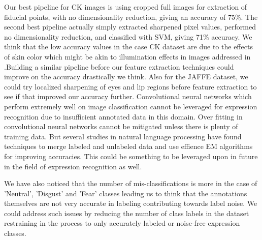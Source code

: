 \documentclass[10pt,twocolumn,letterpaper]{article}
\begin{document}
Our best pipeline for CK images is using cropped full images for extraction of fiducial points, with no dimensionality reduction, giving an accuracy of 75\%. The second best pipeline actually simply extracted sharpened pixel values, performed no dimensionality reduction, and classified with SVM, giving 71\% accuracy. We think that the low accuracy values in the case CK dataset are due to the effects of skin color which might be akin to illumination effects in images addressed in \cite{FERvariablelighting}.Building a similar pipeline before our feature extraction techniques could improve on the accuracy drastically we think. Also for the JAFFE dataset, we could try localized sharpening of eyes and lip regions before feature extraction to see if that improved our accuracy further. Convolutional neural networks which perform extremely well on image classification cannot be leveraged for expression recognition due to insufficient annotated data in this domain. Over fitting in convolutional neural networks cannot be mitigated unless there is plenty of training data. But several studies in natural language processing \cite{nigam2006} have found techniques to merge labeled and unlabeled data and use effience EM algorithms for improving accuracies. This could be something to be leveraged upon in future in the field of expression recognition as well.

We have also noticed that the number of mis-classifications is more in the case of 'Neutral', 'Disgust' and 'Fear' classes leading us to think that the annotations themselves are not very accurate in labeling contributing towards label noise. We could address such issues by reducing the number of class labels in the dataset restraining in the process to only accurately labeled or  noise-free expression classes.\\
\end{document}
